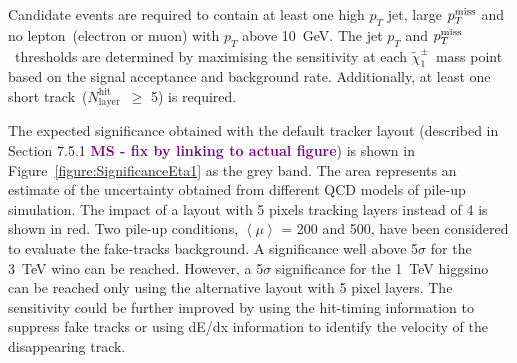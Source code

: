 \documentclass[11pt,twoside,a4paper]{cernrep}
\newcommand{\MS}[1]{\textbf{\textcolor{purple}{MS - #1}}}
\begin{document}
Candidate events are required to contain at least one high $p_{T}$ jet, large \ensuremath{p_{T}^{\rm{miss}}} and no lepton~(electron or muon) with $p_{T}$ above 10~GeV.
The jet $p_{T}$ and \ensuremath{p_{T}^{\rm{miss}}}~thresholds are determined by maximising the sensitivity at each \ensuremath{\tilde{\chi}_{1}^{\pm}}~mass point based on the signal acceptance and background rate. Additionally, at least one short track~(\ensuremath{N_{\mathrm{layer}}^{\mathrm{hit}}}~$\geq$ 5) is required.

The expected significance obtained with the default tracker layout (described in Section 7.5.1 \MS{fix by linking to actual figure}) is shown in Figure~\ref{figure:SignificanceEta1} as the grey band.  The area represents an estimate of the uncertainty obtained from different QCD models of pile-up simulation. The impact of a layout with 5 pixels tracking layers instead of 4 is shown in red. Two pile-up conditions, $\left< \mu \right>$ {=} 200 and 500, have been considered to evaluate the fake-tracks background. A significance well above 5$\sigma$ for the 3~TeV wino can be reached. However, a 5$\sigma$ significance for the 1~TeV higgsino can be reached only using the alternative layout with 5 pixel layers. The sensitivity could be further improved by using the hit-timing information to suppress fake tracks or using dE/dx information to identify the velocity of the disappearing track.
\end{document}
